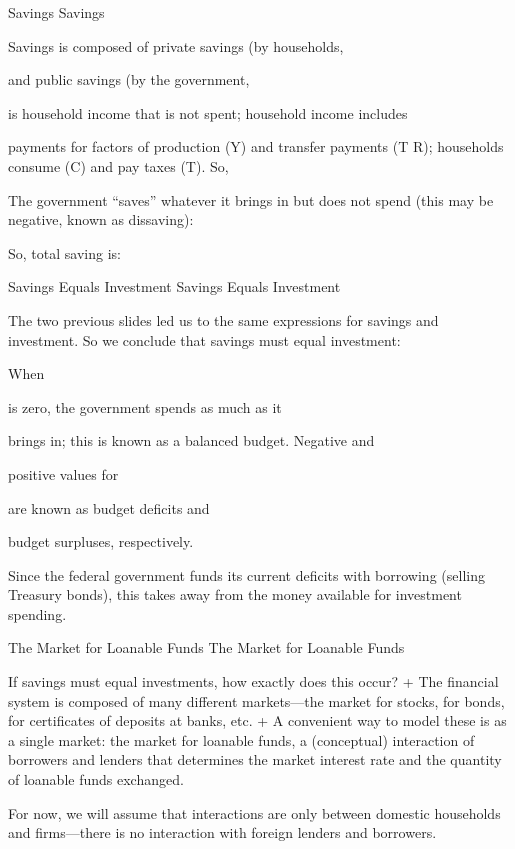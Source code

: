 \documentclass[
  12pt,
  ignorenonframetext,
]{beamer}
\begin{document}
\begin{frame}{Savings}
\protect\hypertarget{savings}{}
Savings

Savings is composed of private savings (by households,

and public savings (by the government,

is household income that is not spent; household income includes

payments for factors of production (Y) and transfer payments (T R);
households consume (C) and pay taxes (T). So,

The government ``saves'' whatever it brings in but does not spend (this
may be negative, known as dissaving):

So, total saving is:
\end{frame}

\begin{frame}{Savings Equals Investment}
\protect\hypertarget{savings-equals-investment}{}
Savings Equals Investment

The two previous slides led us to the same expressions for savings and
investment. So we conclude that savings must equal investment:

When

is zero, the government spends as much as it

brings in; this is known as a balanced budget. Negative and

positive values for

are known as budget deficits and

budget surpluses, respectively.

Since the federal government funds its current deficits with borrowing
(selling Treasury bonds), this takes away from the money available for
investment spending.
\end{frame}

\begin{frame}{The Market for Loanable Funds}
\protect\hypertarget{the-market-for-loanable-funds}{}
The Market for Loanable Funds

If savings must equal investments, how exactly does this occur? + The
financial system is composed of many different markets---the market for
stocks, for bonds, for certificates of deposits at banks, etc. + A
convenient way to model these is as a single market: the market for
loanable funds, a (conceptual) interaction of borrowers and lenders that
determines the market interest rate and the quantity of loanable funds
exchanged.

For now, we will assume that interactions are only between domestic
households and firms---there is no interaction with foreign lenders and
borrowers.
\end{frame}
\end{document}

